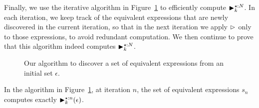 Finally, we use the iterative algorithm in Figure~\ref{so:alg:eqstep} to
efficiently compute $\operatorname{\blacktriangleright}^{\star:N}_k$.  In each iteration, we keep track of
the equivalent expressions that are newly discovered in the current iteration,
so that in the next iteration we apply $\mathbin{\rhd}$ only to those expressions,
to avoid redundant computation.  We then continue to prove that this algorithm
indeed computes $\operatorname{\blacktriangleright}^{\star:N}_k$.
\begin{figure}[ht]
    \centering
    \begin{algorithmic}
                \EndIf{}
            \EndFor{}
        \EndFunction{}
    \end{algorithmic}
    \caption{%
        Our algorithm to discover a set of equivalent expressions from an
        initial set $\epsilon$.
    }\label{so:alg:eqstep}
\end{figure}
\begin{theorem}
    In the algorithm in Figure~\ref{so:alg:eqstep}, at iteration
    $n$, the set of equivalent expressions $s_n$ computes exactly
    $\operatorname{\blacktriangleright}^{\star:n}_k(\epsilon)$.
\end{theorem}
